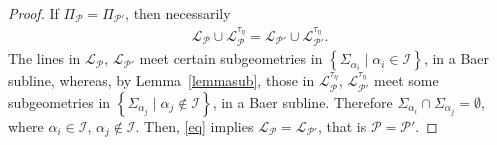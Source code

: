\documentclass[11pt]{article}
\theoremstyle{definition}
\numberwithin{equation}{section}
\def\cI{\mathcal I}
\def\cL{\mathcal L}
\def\cP{\mathcal P}
\begin{document}
\begin{proof}
    If $\Pi_{\cP} = \Pi_{\cP'}$, then necessarily 
    \begin{align}
        \cL_{\cP} \cup \cL_{\cP}^{\tau_{\eta}} = \cL_{\cP'} \cup \cL_{\cP'}^{\tau_{\eta}}. \label{eq}
    \end{align}
The lines in $\cL_{\cP}$, $\cL_{\cP'}$ meet certain subgeometries in $\left\{\Sigma_{\alpha_{i}} \mid \alpha_{i} \in \cI\right\}$, in a Baer subline, whereas, by Lemma~\ref{lemmasub}, those in $\cL_{\cP}^{\tau_{\eta}}$, $\cL_{\cP'}^{\tau_{\eta}}$ meet some subgeometries in $\left\{\Sigma_{\alpha_{j}} \mid \alpha_{j} \not\in \cI\right\}$, in a Baer subline. Therefore $\Sigma_{\alpha_i} \cap \Sigma_{\alpha_j} = \emptyset$, where $\alpha_i \in \cI$, $\alpha_j \notin \cI$. Then, \eqref{eq} implies 
$\cL_{\cP} = \cL_{\cP'}$,
that is $\cP = \cP'$.
\end{proof}
\end{document}
